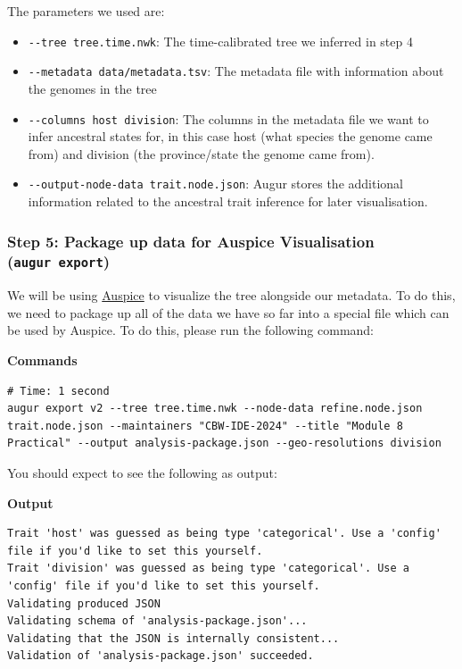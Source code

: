\documentclass[
]{book}
\providecommand{\tightlist}{%
  \setlength{\itemsep}{0pt}\setlength{\parskip}{0pt}}
\begin{document}
The parameters we used are:

\begin{itemize}
\tightlist
\item
  \texttt{-\/-tree\ tree.time.nwk}: The time-calibrated tree we inferred in step 4
\item
  \texttt{-\/-metadata\ data/metadata.tsv}: The metadata file with information about the genomes in the tree
\item
  \texttt{-\/-columns\ host\ division}: The columns in the metadata file we want to infer ancestral states for, in this case host (what species the genome came from) and division (the province/state the genome came from).
\item
  \texttt{-\/-output-node-data\ trait.node.json}: Augur stores the additional information related to the ancestral trait inference for later visualisation.
\end{itemize}

\subsubsection{\texorpdfstring{Step 5: Package up data for Auspice Visualisation (\texttt{augur\ export})}{Step 5: Package up data for Auspice Visualisation (augur export)}}\label{step-5-package-up-data-for-auspice-visualisation-augur-export}

We will be using \href{https://auspice.us/}{Auspice} to visualize the tree alongside our metadata. To do this, we need to package up all of the data we have so far into a special file which can be used by Auspice. To do this, please run the following command:

\textbf{Commands}

\begin{verbatim}
# Time: 1 second
augur export v2 --tree tree.time.nwk --node-data refine.node.json trait.node.json --maintainers "CBW-IDE-2024" --title "Module 8 Practical" --output analysis-package.json --geo-resolutions division
\end{verbatim}

You should expect to see the following as output:

\textbf{Output}

\begin{verbatim}
Trait 'host' was guessed as being type 'categorical'. Use a 'config' file if you'd like to set this yourself.
Trait 'division' was guessed as being type 'categorical'. Use a 'config' file if you'd like to set this yourself.
Validating produced JSON
Validating schema of 'analysis-package.json'...
Validating that the JSON is internally consistent...
Validation of 'analysis-package.json' succeeded.
\end{verbatim}
\end{document}
